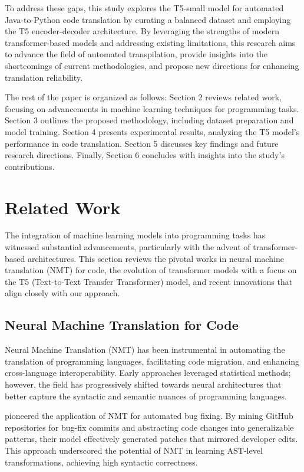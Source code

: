 \documentclass{dhbenelux}
\begin{document}
To address these gaps, this study explores the T5-small model for automated Java-to-Python code translation by curating a balanced dataset and employing the T5 encoder-decoder architecture. By leveraging the strengths of modern transformer-based models and addressing existing limitations, this research aims to advance the field of automated transpilation, provide insights into the shortcomings of current methodologies, and propose new directions for enhancing translation reliability.

The rest of the paper is organized as follows: Section 2 reviews related work, focusing on advancements in machine learning techniques for programming tasks. Section 3 outlines the proposed methodology, including dataset preparation and model training. Section 4 presents experimental results, analyzing the T5 model's performance in code translation. Section 5 discusses key findings and future research directions. Finally, Section 6 concludes with insights into the study's contributions.


\section{Related Work}

The integration of machine learning models into programming tasks has witnessed substantial advancements, particularly with the advent of transformer-based architectures. This section reviews the pivotal works in neural machine translation (NMT) for code, the evolution of transformer models with a focus on the T5 (Text-to-Text Transfer Transformer) model, and recent innovations that align closely with our approach.

\subsection{Neural Machine Translation for Code}

Neural Machine Translation (NMT) has been instrumental in automating the translation of programming languages, facilitating code migration, and enhancing cross-language interoperability. Early approaches leveraged statistical methods; however, the field has progressively shifted towards neural architectures that better capture the syntactic and semantic nuances of programming languages.

\cite{tufano2018} pioneered the application of NMT for automated bug fixing. By mining GitHub repositories for bug-fix commits and abstracting code changes into generalizable patterns, their model effectively generated patches that mirrored developer edits. This approach underscored the potential of NMT in learning AST-level transformations, achieving high syntactic correctness.
\end{document}
